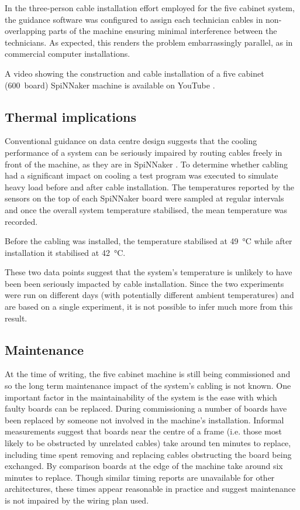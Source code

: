 			In the three-person cable installation effort employed for the five
			cabinet system, the guidance software was configured to assign each
			technician cables in non-overlapping parts of the machine ensuring
			minimal interference between the technicians. As expected, this renders
			the problem embarrassingly parallel, as in commercial computer
			installations.
			
			A video showing the construction and cable installation of a five cabinet
			(\num{600}~board) SpiNNaker machine is available on YouTube
			\cite{heathcote16}.
			
		\subsection{Thermal implications}
			
			Conventional guidance on data centre design suggests that the cooling
			performance of a system can be seriously impaired by routing cables
			freely in front of the machine, as they are in SpiNNaker \cite{cisco07}.
			To determine whether cabling had a significant impact on cooling a test
			program was executed to simulate heavy load before and after cable
			installation.  The temperatures reported by the sensors on the top of
			each SpiNNaker board were sampled at regular intervals and once the
			overall system temperature stabilised, the mean temperature was recorded.
			
			Before the cabling was installed, the temperature stabilised at
			\SI{49}{\celsius} while after installation it stabilised at
			\SI{42}{\celsius}.
			
			These two data points suggest that the system's temperature is unlikely
			to have been been seriously impacted by cable installation. Since the two
			experiments were run on different days (with potentially different
			ambient temperatures) and are based on a single experiment, it is not
			possible to infer much more from this result.
			
		\subsection{Maintenance}
			
			At the time of writing, the five cabinet machine is still being
			commissioned and so the long term maintenance impact of the system's
			cabling is not known. One important factor in the maintainability of the
			system is the ease with which faulty boards can be replaced. During
			commissioning a number of boards have been replaced by someone not
			involved in the machine's installation. Informal measurements suggest
			that boards near the centre of a frame (i.e. those most likely to be
			obstructed by unrelated cables) take around ten minutes to replace,
			including time spent removing and replacing cables obstructing the board
			being exchanged. By comparison boards at the edge of the machine take
			around six minutes to replace. Though similar timing reports are
			unavailable for other architectures, these times appear reasonable in
			practice and suggest maintenance is not impaired by the wiring plan used.
	
